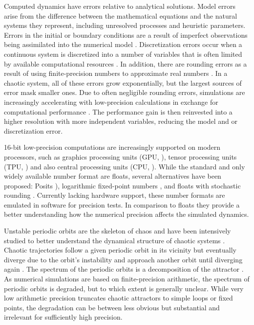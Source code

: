 Computed dynamics have errors relative to analytical solutions. Model errors arise from the difference between the
mathematical equations and the natural systems they represent, including unresolved processes and heuristic parameters.
Errors in the initial or boundary conditions are a result of imperfect observations being assimilated into the numerical model
\citep{Ghil1991}. Discretization errors occur when a continuous system is discretized into a number of variables that is
often limited by available computational resources \citep{Butcher2016}. In addition, there are rounding errors as a result
of using finite-precision numbers to approximate real numbers \citep{Higham2002}. In a chaotic system, all of these errors
grow exponentially, but the largest sources of error mask smaller ones. Due to often negligible rounding errors, simulations
are increasingly accelerating with low-precision calculations in exchange for computational performance \citep{Fuhrer2018,
Nakano2018,Vana2017}. The performance gain is then reinvested into a higher resolution with more independent variables,
reducing the model and or discretization error.

16-bit low-precision computations are increasingly supported on modern processors, such as graphics processing units
(GPU, \cite{Markidis2018}), tensor processing units (TPU, \cite{Jouppi2018}) and also central processing units (CPU,
\cite{Odajima2020,Sato2020}). While the standard and only widely available number format are floats, several alternatives
have been proposed: Posits \citep{Gustafson2017a}), logarithmic fixed-point numbers \citep{Johnson2020}, and
floats with stochastic rounding \citep{Hopkins2020}. Currently lacking hardware support, these number formats are
emulated in software for precision tests. In comparison to floats they provide a better understanding how the numerical
precision affects the simulated dynamics. 

Unstable periodic orbits are the skeleton of chaos \citep{Cvitanovic1991} and have been intensively studied to better
understand the dynamical structure of chaotic systems \citep{Lasagna2020,Leboeuf2004,Ruelle1971}. Chaotic trajectories
follow a given periodic orbit in its vicinity but eventually diverge due to the orbit’s instability and approach another orbit until
diverging again \citep{Maiocchi2021}. The spectrum of the periodic orbits is a decomposition of the attractor \citep{Eckmann2004}.
As numerical simulations are based on finite-precision arithmetic, the spectrum of periodic orbits is degraded, but to which extent
is generally unclear. While very low arithmetic precision truncates chaotic attractors to simple loops or fixed points, the degradation
can be between less obvious but substantial and irrelevant for sufficiently high precision.

